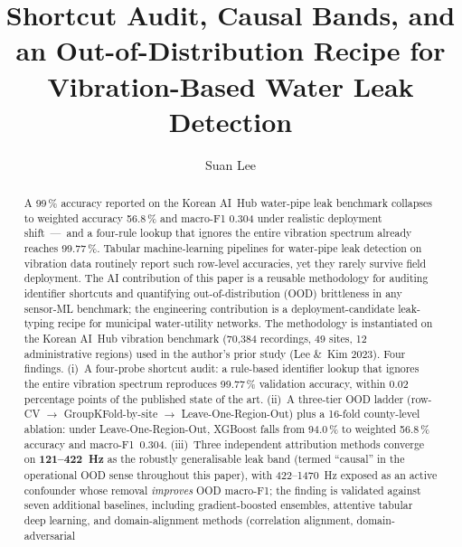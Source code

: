 \documentclass[3p,times,authoryear]{elsarticle}
\theoremstyle{remark}
\begin{document}
\begin{frontmatter}

\title{Shortcut Audit, Causal Bands, and an Out-of-Distribution
Recipe for Vibration-Based Water Leak Detection}

\author[1]{Suan Lee}


\begin{abstract}
A 99\,\% accuracy reported on the Korean AI~Hub water-pipe leak
benchmark collapses to weighted accuracy 56.8\,\% and macro-F1
0.304 under realistic deployment shift~---~and a four-rule lookup
that ignores the entire vibration spectrum already reaches
99.77\,\%. Tabular machine-learning pipelines for water-pipe leak
detection on vibration data routinely report such row-level
accuracies, yet they rarely survive field deployment.
The AI contribution of this paper is a reusable methodology for
auditing identifier shortcuts and quantifying out-of-distribution
(OOD) brittleness in any sensor-ML benchmark; the engineering
contribution is a deployment-candidate leak-typing recipe for municipal
water-utility networks. The methodology is instantiated on the
Korean AI~Hub vibration benchmark (70{,}384 recordings, 49 sites,
12 administrative regions) used in the author's prior study
(Lee \&~Kim 2023). Four findings. (i)~A four-probe shortcut audit: a rule-based
identifier lookup that ignores the entire vibration spectrum
reproduces 99.77\,\% validation accuracy, within 0.02 percentage
points of the published state of the art. (ii)~A three-tier OOD
ladder (row-CV $\rightarrow$ GroupKFold-by-site
$\rightarrow$ Leave-One-Region-Out) plus a 16-fold county-level
ablation: under Leave-One-Region-Out, XGBoost falls from 94.0\,\%
to weighted 56.8\,\% accuracy and macro-F1~0.304. (iii)~Three
independent attribution methods converge on \textbf{121--422~Hz}
as the robustly generalisable leak band (termed ``causal'' in the
operational OOD sense throughout this paper), with 422--1470~Hz
exposed as an active confounder whose removal \emph{improves}
OOD macro-F1; the finding is validated against seven additional
baselines, including
gradient-boosted ensembles, attentive tabular deep learning, and
domain-alignment methods (correlation alignment, domain-adversarial

\end{abstract}
\end{frontmatter}
\end{document}
